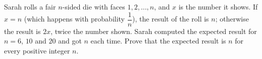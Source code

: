 Sarah rolls a fair $n$-sided die with faces $1,2,\dots,n$, and $x$ is the number it shows. If $x=n$ (which happens with probability $\dfrac1n$), the result of the roll is $n$; otherwise the result is $2x$, twice the number shown. Sarah computed the expected result for $n=6$, $10$ and $20$ and got $n$ each time. Prove that the expected result is $n$ for every positive integer $n$.
